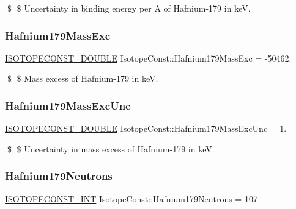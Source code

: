 \$ \$ Uncertainty in binding energy per A of Hafnium-\/179 in keV. \mbox{\label{group___isotope_const-_hafnium-_hf179_ga13dc94436e5c2fdb7afd121b27155ff3}} 
\subsubsection{\texorpdfstring{Hafnium179\+Mass\+Exc}{Hafnium179MassExc}}
{\footnotesize\ttfamily \mbox{\hyperlink{group___isotope_const-_macros_ga8f45a7272ce02c0b4c65c44636ed719a}{I\+S\+O\+T\+O\+P\+E\+C\+O\+N\+S\+T\+\_\+\+D\+O\+U\+B\+LE}} Isotope\+Const\+::\+Hafnium179\+Mass\+Exc = -\/50462.}

\$ \$ Mass excess of Hafnium-\/179 in keV. \mbox{\label{group___isotope_const-_hafnium-_hf179_ga45060c3cc1359b4810145109ff519acd}} 
\subsubsection{\texorpdfstring{Hafnium179\+Mass\+Exc\+Unc}{Hafnium179MassExcUnc}}
{\footnotesize\ttfamily \mbox{\hyperlink{group___isotope_const-_macros_ga8f45a7272ce02c0b4c65c44636ed719a}{I\+S\+O\+T\+O\+P\+E\+C\+O\+N\+S\+T\+\_\+\+D\+O\+U\+B\+LE}} Isotope\+Const\+::\+Hafnium179\+Mass\+Exc\+Unc = 1.}

\$ \$ Uncertainty in mass excess of Hafnium-\/179 in keV. \mbox{\label{group___isotope_const-_hafnium-_hf179_gad9f821b1c0c5eb784ea59813ded795fd}} 
\subsubsection{\texorpdfstring{Hafnium179\+Neutrons}{Hafnium179Neutrons}}
{\footnotesize\ttfamily \mbox{\hyperlink{group___isotope_const-_macros_ga5f18360b3e99483a35c32d789e62621c}{I\+S\+O\+T\+O\+P\+E\+C\+O\+N\+S\+T\+\_\+\+I\+NT}} Isotope\+Const\+::\+Hafnium179\+Neutrons = 107}

